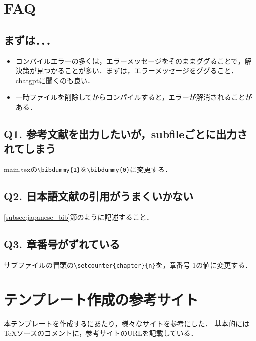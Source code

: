 \documentclass[../main/main]{subfiles}
\begin{document}
\newpage
\section{FAQ}
\subsection*{まずは．．．}
  \begin{itemize}
    \item コンパイルエラーの多くは，エラーメッセージをそのままググることで，解決策が見つかることが多い．まずは，エラーメッセージをググること．chatgptに聞くのも良い．
    \item 一時ファイルを削除してからコンパイルすると，エラーが解消されることがある．
  \end{itemize}

\subsection*{Q1. 参考文献を出力したいが，subfileごとに出力されてしまう}
main.texの\verb|\bibdummy{1}|を\verb|\bibdummy{0}|に変更する．

\subsection*{Q2. 日本語文献の引用がうまくいかない}
\ref{subsec:japanese_bib}節のように記述すること．

\subsection*{Q3. 章番号がずれている}
サブファイルの冒頭の\verb|\setcounter{chapter}{n}|を，章番号-1の値に変更する．


\section{テンプレート作成の参考サイト}
本テンプレートを作成するにあたり，様々なサイトを参考にした．
基本的にはTeXソースのコメントに，参考サイトのURLを記載している．


\end{document}
